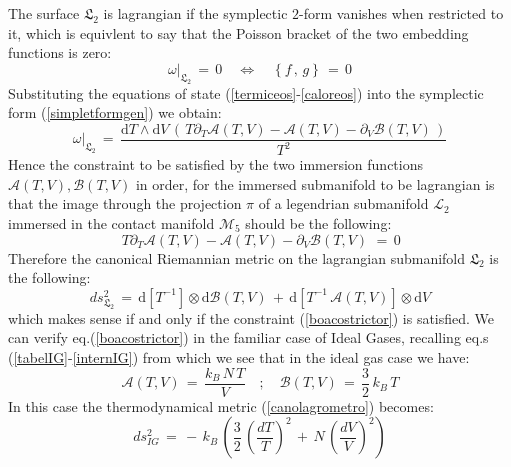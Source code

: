 \documentclass[10pt,a4paper]{article}
\newcommand{\ft}[2]{{\textstyle\frac{#1}{#2}}}
\begin{document}
The surface $\mathfrak{L}_2$  is lagrangian if the symplectic  $2$-form vanishes
when restricted to it, which is equivlent to say that  the Poisson bracket of the two embedding functions
is zero:
\begin{equation}\label{lagrangianita}
    \left. \omega \right.|_{\mathfrak{L}_2} \, = \, 0 \quad
    \Leftrightarrow \quad \left\{f\, , \, g\right\} \, = \, 0
\end{equation}
Substituting the equations of state (\ref{termiceos}-\ref{caloreos})
into the symplectic form (\ref{simpletformgen}) we obtain:
\begin{equation}\label{loscucheros}
  \left. \omega \right.|_{\mathfrak{L}_2} \, = \,  \frac{\mathrm{d}T\wedge \mathrm{d}V \, \left(\,T
   \partial_T\mathcal{A}(T,V)-\mathcal{A}(T,V)-\partial_V\mathcal{B}(T,V)\, \right)}{T^2}
\end{equation}
Hence the constraint to be satisfied by the two immersion functions
$\mathcal{A}(T,V),\mathcal{B}(T,V)$ in order, for
the  immersed submanifold to be  lagrangian is that the
image through the projection $\pi$ of a legendrian submanifold
$\mathcal{L}_2$  immersed in the  contact manifold
$\mathcal{M}_5$ should be  the following:
\begin{equation}\label{boacostrictor}
    \,T
   \partial_T\mathcal{A}(T,V)-\mathcal{A}(T,V)-\partial_V\mathcal{B}(T,V)\,
   \, = \,0
\end{equation}
Therefore the canonical Riemannian metric  on the  lagrangian submanifold
$\mathfrak{L}_2$  is the following:
\begin{equation}\label{canolagrometro}
    ds^2_{\mathfrak{L}_2} \, = \, \mathrm{d}\left[T^{-1}\right ]\otimes \mathrm{d}\mathcal{B}(T,V)\, +
    \, \mathrm{d}\left[T^{-1}\,\mathcal{A}(T,V)\right]\otimes \mathrm{d}V
\end{equation}
which makes sense if and only if the constraint (\ref{boacostrictor}) is satisfied. We can verify eq.(\ref{boacostrictor}) in the familiar case of Ideal Gases, recalling eq.s (\ref{tabelIG}-\ref{internIG}) from which we see that in the ideal gas case we have:
\begin{equation}\label{barramelone}
  \mathcal{A}(T,V)\, = \, \frac{k_B \,N \, T}{V} \quad ; \quad \mathcal{B}(T,V) \, = \, \ft 32 \, k_B \, T
\end{equation}
In this case the thermodynamical metric (\ref{canolagrometro}) becomes:
\begin{equation}\label{gattolagrometro}
    ds^2_{IG} \, = \,  - \,k_B \, \left( \ft 3 2 \, \left(\frac{dT}{T}\right)^2 \, + \, N \, \left(\frac{dV}{V}\right)^2 \right)
\end{equation}
\end{document}
